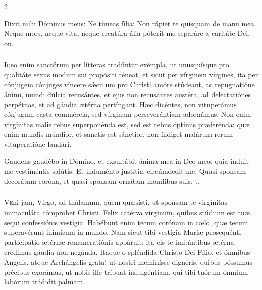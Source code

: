 \documentclass[9pt,twoside]{extarticle}
\begin{document}
\begin{multicols}{2}
\begin{tightlist}{}
\item {} Dixit mihi Dóminus meus: Ne tímeas fília: \textred{*} Non rápiet te quisquam de manu mea.  Neque mors, neque vita, neque creatúra ália póterit me separáre a caritáte Dei. on.
\end{tightlist}

\subsubsection*{\center {}}
\lettrine{I}deo enim sanctórum per lítteras tradúntur exémpla, ut unusquísque pro qualitáte sexus modum sui propósiti téneat, et sicut per vírginem vírgines, ita per cónjugem cónjuges víncere sǽculum pro Christi amóre stúdeant, ac repugnatióne ánimi, mundi dúlcia recusántes, et ejus non recusántes austéra, ad delectatiónes perpétuas, et ad gáudia ætérna pertíngant. Hæc dicéntes, non vituperámus cónjugum casta commércia, sed vírginum perseverántiam adornámus. Non enim virgínitas malis rebus superponénda est, sed est rebus óptimis præferénda: quæ enim mundis múndior, et sanctis est sánctior, non índiget malárum rerum vituperatióne laudári.

\begin{tightlist}{}
\item {} Gaudens gaudébo in Dómino, et exsultábit ánima mea in Deo meo, quia índuit me vestiméntis salútis; \textred{*} Et induménto justítiæ circúmdedit me.  Quasi sponsam decorátam coróna, et quasi sponsam ornátam monílibus suis. t.
\end{tightlist}

\subsubsection*{\center {}}
\lettrine{V}eni jam, Virgo, ad thálamum, quem quæsísti, ut sponsam te virgínitas immaculáta cómprobet Christi. Felix catérva vírginum, quibus stúdium est tuæ sequi confessiónis vestígia. Habébunt enim tecum corónam in cœlo, quæ tecum superavérunt inimícum in mundo. Nam sicut tibi vestígia Maríæ prosequénti participátio ætérnæ remuneratiónis appáruit: ita eis te imitántibus ætérna crédimus gáudia non negánda. Itaque o spléndida Christo Dei Fílio, et ómnibus Angelis, atque Archángelis grata! ut nostri meminísse dignéris, quibus póssumus précibus exorámus, ut nobis ille tríbuat indulgéntiam, qui tibi tuórum ómnium labórum trádidit palmam. 


\end{multicols}
\end{document}
